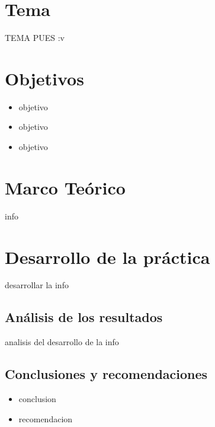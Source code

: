 \documentclass[10pt, a4paper]{article}
\begin{document}


\section*{Tema}
TEMA PUES :v

\section*{Objetivos}
\begin{itemize}
    \item objetivo
    \item objetivo
    \item objetivo
\end{itemize}
\section*{Marco Teórico}
info
\section*{Desarrollo de la práctica}
desarrollar la info
\subsection*{Análisis de los resultados}
analisis del desarrollo de la info

\subsection*{Conclusiones y recomendaciones}
\begin{itemize}
    \item conclusion
    \item recomendacion
\end{itemize}



\end{document}
